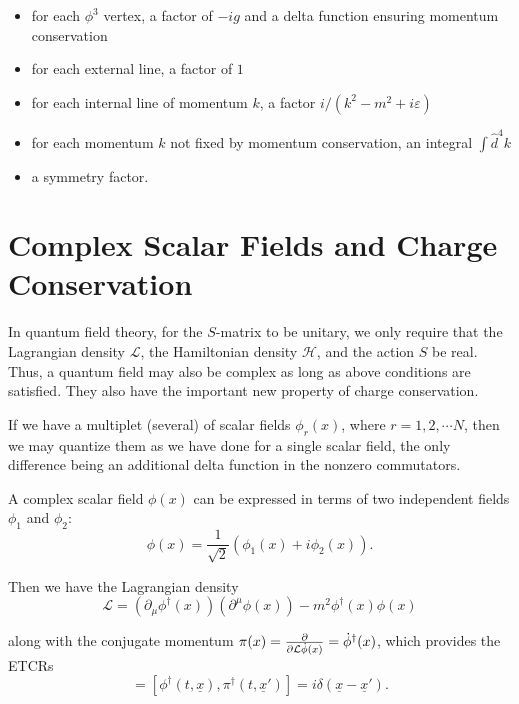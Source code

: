 \documentclass{article}
\begin{document}
\begin{itemize}
    \item for each $\phi^3$ vertex, a factor of $-ig$ and a delta function ensuring momentum conservation
    \item for each external line, a factor of $1$
    \item for each internal line of momentum $k$, a factor $i/(k^2-m^2+i\varepsilon)$
    \item for each momentum $k$ not fixed by momentum conservation, an integral $\int \hat{d}^4k$
    \item a symmetry factor.
\end{itemize}

\section{Complex Scalar Fields and Charge Conservation}

In quantum field theory, for the $S$-matrix to be unitary, we only require that the Lagrangian density $\mathcal{L}$, the Hamiltonian density $\mathcal{H}$, and the action $S$ be real. Thus, a quantum field may also be complex as long as above conditions are satisfied. They also have the important new property of charge conservation.

If we have a multiplet (several) of scalar fields $\phi_r(x)$, where $r=1,2,\cdots N$, then we may quantize them as we have done for a single scalar field, the only difference being an additional delta function in the nonzero commutators.

A complex scalar field $\phi(x)$ can be expressed in terms of two independent fields $\phi_1$ and $\phi_2$:
\begin{equation}
    \phi(x)=\frac{1}{\sqrt{2}}(\phi_1(x) + i\phi_2(x)).
\end{equation}

Then we have the Lagrangian density
\begin{equation}
    \mathcal{L} = \left(\partial_\mu\phi^\dagger(x)\right)\left(\partial^\mu\phi(x)\right)-m^2\phi^\dagger(x)\phi(x)
\end{equation}

along with the conjugate momentum $\pi(x)=\pdv{\mathcal{L}{\dot{\phi}(x)}}=\dot{\phi}^\dagger(x)$, which provides the ETCRs
\begin{equation}
    [\phi(t,\underline{x}), \pi(t,\underline{x}')]=[\phi^\dagger(t,\underline{x}),\pi^\dagger(t,\underline{x}')] = i\delta(\underline{x}-\underline{x}').
\end{equation}
\end{document}
